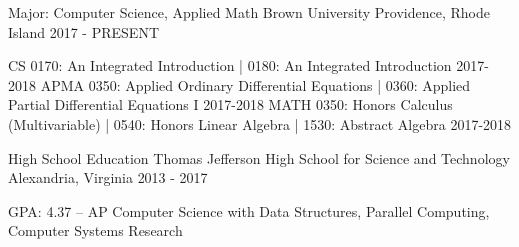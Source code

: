 \begin{cventries}
  \cventry
    {Major: Computer Science, Applied Math}
    {Brown University}
    {Providence, Rhode Island}
    {2017 - PRESENT}
    {
        \vspace{-2em}
        \begin{cvhonors}
			\cvhonor
			{CS}
			{0170: An Integrated Introduction | 0180: An Integrated Introduction}
			{}
			{2017-2018}
			\cvhonor
			{APMA}
			{0350: Applied Ordinary Differential Equations | 0360: Applied Partial Differential Equations I}
			{}
			{2017-2018}
			\cvhonor
			{MATH}
			{0350: Honors Calculus (Multivariable) | 0540: Honors Linear Algebra | 1530: Abstract Algebra}
			{}
			{2017-2018}
        \end{cvhonors}
		\vspace{-1.25em}
    }
\end{cventries}

\begin{cventries}
  \cventry
    {High School Education}
    {Thomas Jefferson High School for Science and Technology}
    {Alexandria, Virginia}
    {2013 - 2017}
    {
      \begin{cvitems}
		\item {GPA: 4.37 -- AP Computer Science with Data Structures, Parallel Computing, Computer Systems Research}
      \end{cvitems}
    }
	\vspace{-1.0em}
\end{cventries}

